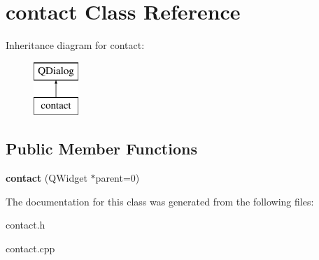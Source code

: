 \hypertarget{classcontact}{}\section{contact Class Reference}
\label{classcontact}
Inheritance diagram for contact\+:\begin{figure}[H]
\begin{center}
\leavevmode
\includegraphics[height=2.000000cm]{classcontact}
\end{center}
\end{figure}
\subsection*{Public Member Functions}
\begin{DoxyCompactItemize}
\item 
\mbox{\label{classcontact_a530a040af99efa8cb80a0e97fbd1bf34}} 
{\bfseries contact} (Q\+Widget $\ast$parent=0)
\end{DoxyCompactItemize}


The documentation for this class was generated from the following files\+:\begin{DoxyCompactItemize}
\item 
contact.\+h\item 
contact.\+cpp\end{DoxyCompactItemize}
